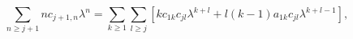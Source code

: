 \begin{equation}
\sum_{n\geq j+1} n c_{j+1,n}\lambda^{n}=\sum_{k\geq 1}\sum_{l\geq j}[kc_{1k}c_{jl}\lambda^{k+l}+l(k-1)a_{1k}c_{jl}\lambda^{k+l-1}],\label{a.21}
\end{equation}

